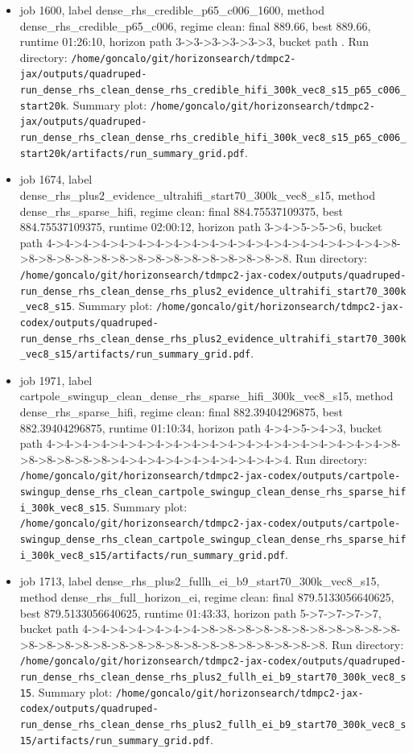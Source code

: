 \begin{itemize}
\item job 1600, label dense\_rhs\_credible\_p65\_c006\_1600, method dense\_rhs\_credible\_p65\_c006, regime clean: final 889.66, best 889.66, runtime 01:26:10, horizon path 3->3->3->3->3->3, bucket path . Run directory: \texttt{/home/goncalo/git/horizonsearch/tdmpc2-jax/outputs/quadruped-run\_dense\_rhs\_clean\_dense\_rhs\_credible\_hifi\_300k\_vec8\_s15\_p65\_c006\_start20k}. Summary plot: \texttt{/home/goncalo/git/horizonsearch/tdmpc2-jax/outputs/quadruped-run\_dense\_rhs\_clean\_dense\_rhs\_credible\_hifi\_300k\_vec8\_s15\_p65\_c006\_start20k/artifacts/run\_summary\_grid.pdf}.
\item job 1674, label dense\_rhs\_plus2\_evidence\_ultrahifi\_start70\_300k\_vec8\_s15, method dense\_rhs\_sparse\_hifi, regime clean: final 884.75537109375, best 884.75537109375, runtime 02:00:12, horizon path 3->4->5->5->6, bucket path 4->4->4->4->4->4->4->4->4->4->4->4->4->4->4->4->4->4->4->8->8->8->8->8->8->8->8->8->8->8->8->8->8->8->8. Run directory: \texttt{/home/goncalo/git/horizonsearch/tdmpc2-jax-codex/outputs/quadruped-run\_dense\_rhs\_clean\_dense\_rhs\_plus2\_evidence\_ultrahifi\_start70\_300k\_vec8\_s15}. Summary plot: \texttt{/home/goncalo/git/horizonsearch/tdmpc2-jax-codex/outputs/quadruped-run\_dense\_rhs\_clean\_dense\_rhs\_plus2\_evidence\_ultrahifi\_start70\_300k\_vec8\_s15/artifacts/run\_summary\_grid.pdf}.
\item job 1971, label cartpole\_swingup\_clean\_dense\_rhs\_sparse\_hifi\_300k\_vec8\_s15, method dense\_rhs\_sparse\_hifi, regime clean: final 882.39404296875, best 882.39404296875, runtime 01:10:34, horizon path 4->4->5->4->3, bucket path 4->4->4->4->4->4->4->4->4->4->4->4->4->4->4->4->4->4->4->8->8->8->8->8->8->4->4->4->4->4->4->4->4->4->4. Run directory: \texttt{/home/goncalo/git/horizonsearch/tdmpc2-jax-codex/outputs/cartpole-swingup\_dense\_rhs\_clean\_cartpole\_swingup\_clean\_dense\_rhs\_sparse\_hifi\_300k\_vec8\_s15}. Summary plot: \texttt{/home/goncalo/git/horizonsearch/tdmpc2-jax-codex/outputs/cartpole-swingup\_dense\_rhs\_clean\_cartpole\_swingup\_clean\_dense\_rhs\_sparse\_hifi\_300k\_vec8\_s15/artifacts/run\_summary\_grid.pdf}.
\item job 1713, label dense\_rhs\_plus2\_fullh\_ei\_b9\_start70\_300k\_vec8\_s15, method dense\_rhs\_full\_horizon\_ei, regime clean: final 879.5133056640625, best 879.5133056640625, runtime 01:43:33, horizon path 5->7->7->7->7, bucket path 4->4->4->4->4->4->4->8->8->8->8->8->8->8->8->8->8->8->8->8->8->8->8->8->8->8->8->8->8->8->8->8->8->8->8. Run directory: \texttt{/home/goncalo/git/horizonsearch/tdmpc2-jax-codex/outputs/quadruped-run\_dense\_rhs\_clean\_dense\_rhs\_plus2\_fullh\_ei\_b9\_start70\_300k\_vec8\_s15}. Summary plot: \texttt{/home/goncalo/git/horizonsearch/tdmpc2-jax-codex/outputs/quadruped-run\_dense\_rhs\_clean\_dense\_rhs\_plus2\_fullh\_ei\_b9\_start70\_300k\_vec8\_s15/artifacts/run\_summary\_grid.pdf}.

\end{itemize}
